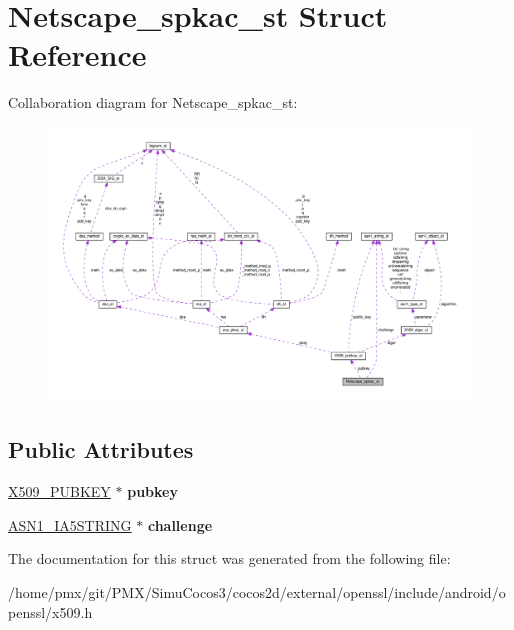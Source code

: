 \hypertarget{structNetscape__spkac__st}{}\section{Netscape\+\_\+spkac\+\_\+st Struct Reference}
\label{structNetscape__spkac__st}


Collaboration diagram for Netscape\+\_\+spkac\+\_\+st\+:
\nopagebreak
\begin{figure}[H]
\begin{center}
\leavevmode
\includegraphics[width=350pt]{structNetscape__spkac__st__coll__graph}
\end{center}
\end{figure}
\subsection*{Public Attributes}
\begin{DoxyCompactItemize}
\item 
\mbox{\label{structNetscape__spkac__st_ab1c99df2f03bcb8b4a31d9902fb1fb35}} 
\hyperlink{structX509__pubkey__st}{X509\+\_\+\+P\+U\+B\+K\+EY} $\ast$ {\bfseries pubkey}
\item 
\mbox{\label{structNetscape__spkac__st_a527864c246a5886c781dba0dd8ae2202}} 
\hyperlink{structasn1__string__st}{A\+S\+N1\+\_\+\+I\+A5\+S\+T\+R\+I\+NG} $\ast$ {\bfseries challenge}
\end{DoxyCompactItemize}


The documentation for this struct was generated from the following file\+:\begin{DoxyCompactItemize}
\item 
/home/pmx/git/\+P\+M\+X/\+Simu\+Cocos3/cocos2d/external/openssl/include/android/openssl/x509.\+h\end{DoxyCompactItemize}
